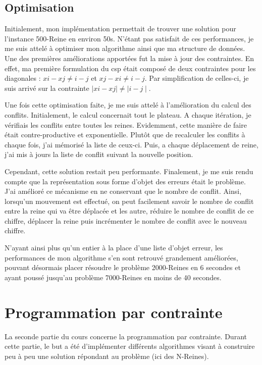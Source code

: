 \documentclass[a4paper,10pt]{article}
\begin{document}
\subsection{Optimisation}

Initialement, mon implémentation permettait de trouver une solution pour l'instance 500-Reine en environ 50s. N'étant pas satisfait de ces performances, je me suis attelé à optimiser mon algorithme ainsi que ma structure de données. Une des premières améliorations apportées fut la mise à jour des contraintes. En effet, ma première formulation du csp était composé de deux contraintes pour les diagonales : $xi - xj  \neq  i - j$ et $xj - xi  \neq  i - j$. Par simplification de celles-ci, je suis arrivé sur la contrainte $\mid xi - xj\mid \neq \mid i - j\mid $.

Une fois cette optimisation faite, je me suis attelé à l'amélioration du calcul des conflits. Initialement, le calcul concernait tout le plateau. A chaque itération, je vérifiais les conflits entre toutes les reines. Evidemment, cette manière de faire était contre-productive et exponentielle. Plutôt que de recalculer les conflits à chaque fois, j'ai mémorisé la liste de ceux-ci. Puis, a chaque déplacement de reine, j'ai mis à jours la liste de conflit suivant la nouvelle position.

Cependant, cette solution restait peu performante. Finalement, je me suis rendu compte que la représentation sous forme d'objet des erreurs était le problème. J'ai amélioré ce mécanisme en ne conservant que le nombre de conflit. Ainsi, lorsqu'un mouvement est effectué, on peut facilement savoir le nombre de conflit entre la reine qui va être déplacée et les autre, réduire le nombre de conflit de ce chiffre, déplacer la reine puis incrémenter le nombre de conflit avec le nouveau chiffre.

N'ayant ainsi plus qu'un entier à la place d'une liste d'objet erreur, les performances de mon algorithme s'en sont retrouvé grandement améliorées, pouvant désormais placer résoudre le problème 2000-Reines en 6 secondes et ayant poussé jusqu'au problème 7000-Reines en moins de 40 secondes.

\section{Programmation par contrainte}

La seconde partie du cours concerne la programmation par contrainte. Durant cette partie, le but a été d'implémenter différents algorithmes visant à construire peu à peu une solution répondant au problème (ici des N-Reines).
\end{document}
